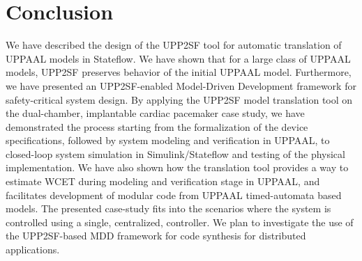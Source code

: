 \section{Conclusion}

We have described the design of the UPP2SF tool for automatic translation of UPPAAL models in Stateflow. We have shown that for a large class of UPPAAL models, UPP2SF preserves behavior of the initial UPPAAL model. Furthermore, we have presented an UPP2SF-enabled Model-Driven Development framework for safety-critical system design. By applying the UPP2SF model translation tool on the dual-chamber, implantable cardiac pacemaker case study, we have demonstrated the process starting from the formalization of the device specifications, followed by system modeling and verification in UPPAAL, to closed-loop system simulation in Simulink/Stateflow and testing of the physical implementation. We have also shown how the translation tool provides a way to estimate WCET during modeling and verification stage in UPPAAL, and facilitates development of modular code from UPPAAL timed-automata based models. The presented case-study fits into the scenarios where the system is controlled using a single, centralized, controller. 
We plan to investigate the use of the UPP2SF-based MDD framework for code synthesis for distributed applications.














